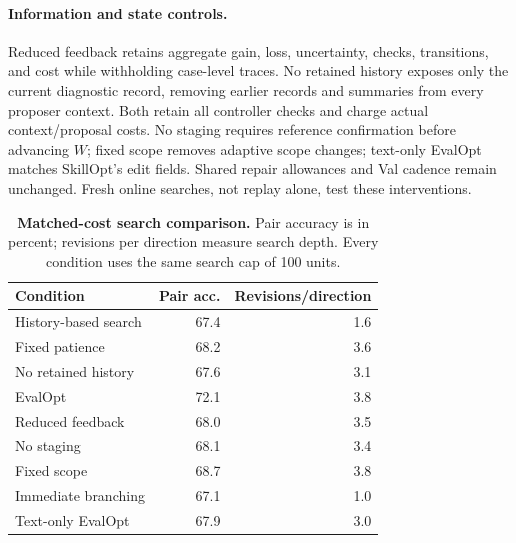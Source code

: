 \paragraph{Information and state controls.}
Reduced feedback retains aggregate gain, loss, uncertainty, checks, transitions, and cost while withholding case-level traces.
No retained history exposes only the current diagnostic record, removing earlier records and summaries from every proposer context.
Both retain all controller checks and charge actual context/proposal costs.
No staging requires reference confirmation before advancing $W$; fixed scope removes adaptive scope changes; text-only EvalOpt matches SkillOpt's edit fields.
Shared repair allowances and Val cadence remain unchanged.
Fresh online searches, not replay alone, test these interventions.

\begin{table}[!htbp]
\caption{\textbf{Matched-cost search comparison.}
Pair accuracy is in percent; revisions per direction measure search depth.
Every condition uses the same search cap of 100 units.}
\label{tab:search-results}
\centering\small
\begin{tabularx}{\linewidth}{@{}Yrr@{}}
\toprule
Condition & Pair acc. & Revisions/direction\\
\midrule
History-based search & 67.4 & 1.6\\
Fixed patience & 68.2 & 3.6\\
No retained history & 67.6 & 3.1\\
EvalOpt & 72.1 & 3.8\\
Reduced feedback & 68.0 & 3.5\\
No staging & 68.1 & 3.4\\
Fixed scope & 68.7 & 3.8\\
Immediate branching & 67.1 & 1.0\\
Text-only EvalOpt & 67.9 & 3.0\\
\bottomrule
\end{tabularx}
\end{table}
